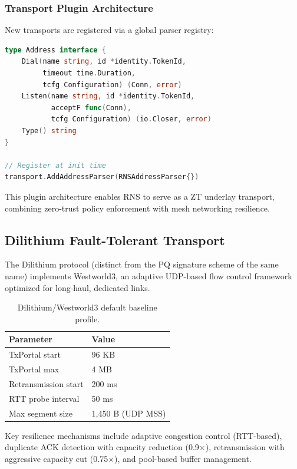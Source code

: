 \documentclass[11pt,letterpaper]{article}
\begin{document}
\subsubsection{Transport Plugin Architecture}

New transports are registered via a global parser registry:

\begin{lstlisting}[language=Go,caption={Transport plugin registration pattern.}]
type Address interface {
    Dial(name string, id *identity.TokenId,
         timeout time.Duration,
         tcfg Configuration) (Conn, error)
    Listen(name string, id *identity.TokenId,
           acceptF func(Conn),
           tcfg Configuration) (io.Closer, error)
    Type() string
}

// Register at init time
transport.AddAddressParser(RNSAddressParser{})
\end{lstlisting}

This plugin architecture enables RNS to serve as a ZT underlay transport, combining zero-trust policy enforcement with mesh networking resilience.

\subsection{Dilithium Fault-Tolerant Transport}

The Dilithium protocol (distinct from the PQ signature scheme of the same name) implements Westworld3, an adaptive UDP-based flow control framework optimized for long-haul, dedicated links.

\begin{table}[H]
\centering
\begin{tabular}{@{}lp{6cm}@{}}
\toprule
\textbf{Parameter} & \textbf{Value} \\
\midrule
TxPortal start & 96 KB \\
TxPortal max & 4 MB \\
Retransmission start & 200 ms \\
RTT probe interval & 50 ms \\
Max segment size & 1,450 B (UDP MSS) \\
\bottomrule
\end{tabular}
\caption{Dilithium/Westworld3 default baseline profile.}
\label{tab:dilithium}
\end{table}

Key resilience mechanisms include adaptive congestion control (RTT-based), duplicate ACK detection with capacity reduction (0.9$\times$), retransmission with aggressive capacity cut (0.75$\times$), and pool-based buffer management.
\end{document}
